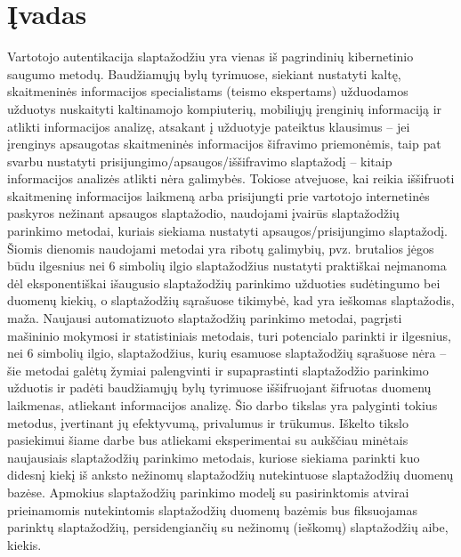 \documentclass{VUMIFInfBakalaurinis}
\begin{document}
\section{Įvadas}
Vartotojo autentikacija slaptažodžiu yra vienas iš pagrindinių kibernetinio 
saugumo metodų.
Baudžiamųjų bylų tyrimuose, siekiant nustatyti kaltę, skaitmeninės informacijos 
specialistams (teismo ekspertams) užduodamos užduotys nuskaityti kaltinamojo 
kompiuterių, mobiliųjų įrenginių informaciją ir atlikti informacijos analizę, 
atsakant į užduotyje pateiktus klausimus -- jei įrenginys apsaugotas 
skaitmeninės informacijos šifravimo priemonėmis, taip pat svarbu nustatyti 
prisijungimo/apsaugos/iššifravimo slaptažodį -- kitaip informacijos analizės 
atlikti nėra galimybės.
Tokiose atvejuose, kai reikia iššifruoti skaitmeninę informacijos laikmeną arba 
prisijungti prie vartotojo internetinės paskyros nežinant apsaugos slaptažodio, 
naudojami įvairūs slaptažodžių parinkimo metodai, kuriais siekiama nustatyti 
apsaugos/prisijungimo slaptažodį. Šiomis dienomis naudojami metodai yra ribotų 
galimybių, pvz. brutalios jėgos būdu ilgesnius nei 6 simbolių ilgio 
slaptažodžius nustatyti praktiškai neįmanoma dėl eksponentiškai išaugusio 
slaptažodžių parinkimo užduoties sudėtingumo bei duomenų kiekių, o slaptažodžių 
sąrašuose tikimybė, kad yra ieškomas slaptažodis, maža.
Naujausi automatizuoto slaptažodžių parinkimo metodai, pagrįsti mašininio 
mokymosi ir statistiniais metodais, turi potencialo parinkti ir ilgesnius, nei 6 
simbolių ilgio, slaptažodžius, kurių esamuose slaptažodžių sąrašuose nėra -- šie 
metodai galėtų žymiai palengvinti ir supaprastinti slaptažodžio parinkimo 
užduotis ir padėti baudžiamųjų bylų tyrimuose iššifruojant šifruotas duomenų 
laikmenas, atliekant informacijos analizę. Šio darbo tikslas yra palyginti 
tokius metodus, įvertinant jų efektyvumą, privalumus ir trūkumus.
Iškelto tikslo pasiekimui šiame darbe bus atliekami eksperimentai su aukščiau 
minėtais naujausiais slaptažodžių parinkimo metodais, kuriose siekiama parinkti 
kuo didesnį kiekį iš anksto nežinomų slaptažodžių nutekintuose slaptažodžių 
duomenų bazėse. Apmokius slaptažodžių parinkimo modelį su pasirinktomis atvirai 
prieinamomis nutekintomis slaptažodžių duomenų bazėmis bus fiksuojamas parinktų 
slaptažodžių, persidengiančių su nežinomų (ieškomų) slaptažodžių aibe, kiekis.
\end{document}
